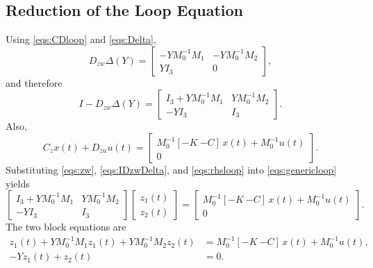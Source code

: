 \documentclass[11pt]{article}
\begin{document}
\subsection{Reduction of the Loop Equation}
Using \eqref{eqs:CDloop} and \eqref{eqs:Delta},
\begin{equation}
    D_{zw}\Delta(Y)
    =
    \begin{bmatrix}
        -Y M_0^{-1}M_1 & -Y M_0^{-1}M_2 \\
        Y I_3 & 0
    \end{bmatrix},
    \label{eqs:DzwDelta}
\end{equation}
and therefore
\begin{equation}
    I - D_{zw}\Delta(Y)
    =
    \begin{bmatrix}
        I_3 + Y M_0^{-1}M_1 & Y M_0^{-1}M_2 \\
        -Y I_3 & I_3
    \end{bmatrix}.
    \label{eqs:IDzwDelta}
\end{equation}
Also,
\begin{equation}
    C_z x(t) + D_{zu}u(t)
    =
    \begin{bmatrix}
        M_0^{-1}[-K\ {-C}]\,x(t) + M_0^{-1}u(t) \\
        0
    \end{bmatrix}.
    \label{eqs:rhsloop}
\end{equation}
Substituting \eqref{eqs:zw}, \eqref{eqs:IDzwDelta}, and \eqref{eqs:rhsloop}
into \eqref{eqs:genericloop} yields
\begin{equation}
    \begin{bmatrix}
        I_3 + Y M_0^{-1}M_1 & Y M_0^{-1}M_2 \\
        -Y I_3 & I_3
    \end{bmatrix}
    \begin{bmatrix}
        z_1(t) \\
        z_2(t)
    \end{bmatrix}
    =
    \begin{bmatrix}
        M_0^{-1}[-K\ {-C}]\,x(t) + M_0^{-1}u(t) \\
        0
    \end{bmatrix}.
    \label{eqs:blockloop}
\end{equation}
The two block equations are
\begin{align}
    z_1(t) + Y M_0^{-1}M_1 z_1(t) + Y M_0^{-1}M_2 z_2(t)
    &= M_0^{-1}[-K\ {-C}]\,x(t) + M_0^{-1}u(t),
    \label{eqs:block1} \\
    -Y z_1(t) + z_2(t) &= 0.
    \label{eqs:block2}
\end{align}
\end{document}
